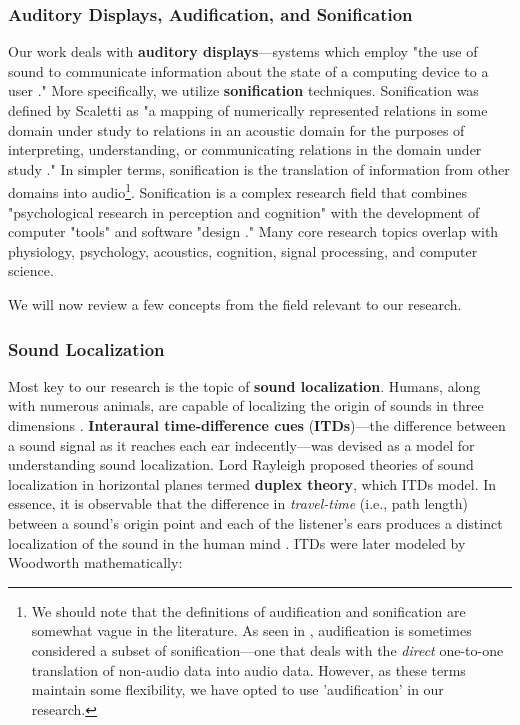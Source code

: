\documentclass{report}
\newcommand{\tech}[1]{\textbf{#1}}
\begin{document}
\subsubsection{Auditory Displays, Audification, and Sonification}
Our work deals with \tech{auditory displays}---systems which employ "the use of sound to communicate information about the state of a computing device to a user \cite{audiodisplays}." More specifically, we utilize \tech{sonification} techniques. Sonification was defined by Scaletti as "a mapping of numerically represented relations in some domain under study to relations in an acoustic domain for the purposes of interpreting, understanding, or communicating relations in the domain under study \cite{kramer1994auditory}." In simpler terms, sonification is the translation of information from other domains into audio\footnote{We should note that the definitions of audification and sonification are somewhat vague in the literature. As seen in \cite{vickers2017directsegmentedsonificationcharacteristic}, audification is sometimes considered a subset of sonification---one that deals with the \emph{direct} one-to-one translation of non-audio data into audio data. However, as these terms maintain some flexibility, we have opted to use 'audification' in our research.}. Sonification is a complex research field that combines "psychological research in perception and cognition" with the development of computer "tools" and software "design \cite{kramer2010sonification}." Many core research topics overlap with physiology, psychology, acoustics, cognition, signal processing, and computer science. 

We will now review a few concepts from the field relevant to our research.

\subsubsection{Sound Localization}
Most key to our research is the topic of \tech{sound localization}. Humans, along with numerous animals, are capable of localizing the origin of sounds in three dimensions \cite{middlebrooks2015sound}. \tech{Interaural time-difference cues} (\tech{ITDs})---the difference between a sound signal as it reaches each ear indecently---was devised as a model for understanding sound localization. Lord Rayleigh proposed theories of sound localization in horizontal planes termed \tech{duplex theory}, which ITDs model. In essence, it is observable that the difference in \emph{travel-time} (i.e., path length) between a sound's origin point and each of the listener's ears produces a distinct localization of the sound in the human mind \cite{middlebrooks2015sound}. ITDs were later modeled by Woodworth mathematically:
\end{document}
